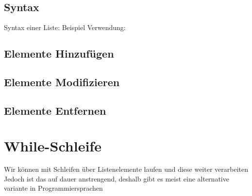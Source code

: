 \subsection{Syntax}
\begin{frame}
    \slidehead
    Syntax einer Liste:
    Beispiel Verwendung:
\end{frame}

\subsection{Elemente Hinzufügen}
\begin{frame}
    \slidehead
\end{frame}

\subsection{Elemente Modifizieren}
\begin{frame}
    \slidehead
\end{frame}

\subsection{Elemente Entfernen}
\begin{frame}
    \slidehead
\end{frame}

\livecoding

\section{While-Schleife}
\subtitle{Schleifen mit Listen}


\begin{frame}[fragile]
    \slidehead
    Wir können mit Schleifen über Listenelemente laufen und diese weiter verarbeiten
    Jedoch ist das auf dauer anstrengend, deshalb gibt es meist eine alternative variante in Programmiersprachen
\end{frame}


